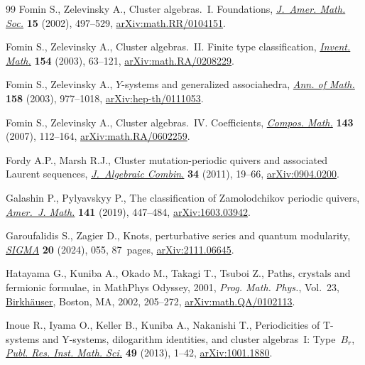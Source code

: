 \documentclass[pdftex]{sigma}
\numberwithin{equation}{section}
\theoremstyle{definition}
\begin{document}
\begin{thebibliography}{99}
Fomin S., Zelevinsky A., Cluster algebras.~{I}. {F}oundations,
 \href{https://doi.org/10.1090/S0894-0347-01-00385-X}{\textit{J.~Amer. Math.
 Soc.}} \textbf{15} (2002), 497--529,
 \href{http://arxiv.org/abs/math.RR/0104151}{arXiv:math.RR/0104151}.

Fomin S., Zelevinsky A., Cluster algebras.~{II}. {F}inite type classification,
 \href{https://doi.org/10.1007/s00222-003-0302-y}{\textit{Invent. Math.}}
 \textbf{154} (2003), 63--121,
 \href{http://arxiv.org/abs/math.RA/0208229}{arXiv:math.RA/0208229}.

Fomin S., Zelevinsky A., {$Y$}-systems and generalized associahedra,
 \href{https://doi.org/10.4007/annals.2003.158.977}{\textit{Ann. of Math.}}
 \textbf{158} (2003), 977--1018,
 \href{http://arxiv.org/abs/hep-th/0111053}{arXiv:hep-th/0111053}.

Fomin S., Zelevinsky A., Cluster algebras.~{IV}. {C}oefficients,
 \href{https://doi.org/10.1112/S0010437X06002521}{\textit{Compos. Math.}}
 \textbf{143} (2007), 112--164,
 \href{http://arxiv.org/abs/math.RA/0602259}{arXiv:math.RA/0602259}.

Fordy A.P., Marsh R.J., Cluster mutation-periodic quivers and associated
 {L}aurent sequences,
 \href{https://doi.org/10.1007/s10801-010-0262-4}{\textit{J.~Algebraic
 Combin.}} \textbf{34} (2011), 19--66,
 \href{http://arxiv.org/abs/0904.0200}{arXiv:0904.0200}.

Galashin P., Pylyavskyy P., The classification of {Z}amolodchikov periodic
 quivers, \href{https://doi.org/10.1353/ajm.2019.0010}{\textit{Amer.~J.
 Math.}} \textbf{141} (2019), 447--484,
 \href{http://arxiv.org/abs/1603.03942}{arXiv:1603.03942}.

Garoufalidis S., Zagier D., Knots, perturbative series and quantum modularity,
 \href{https://doi.org/10.3842/SIGMA.2024.055}{\textit{SIGMA}} \textbf{20}
 (2024), 055, 87~pages,
 \href{http://arxiv.org/abs/2111.06645}{arXiv:2111.06645}.

Hatayama G., Kuniba A., Okado M., Takagi T., Tsuboi Z., Paths, crystals and
 fermionic formulae, in Math{P}hys {O}dyssey, 2001, \textit{Prog. Math.
 Phys.}, Vol.~23,
 \href{https://doi.org/10.1007/978-1-4612-0087-1_9}{Birkh\"auser}, Boston, MA,
 2002, 205--272,
 \href{http://arxiv.org/abs/math.QA/0102113}{arXiv:math.QA/0102113}.

Inoue R., Iyama O., Keller B., Kuniba A., Nakanishi T., Periodicities of
 {T}-systems and {Y}-systems, dilogarithm identities, and cluster
 algebras~{I}: {T}ype~{$B_r$},
 \href{https://doi.org/10.4171/PRIMS/95}{\textit{Publ. Res. Inst. Math. Sci.}}
 \textbf{49} (2013), 1--42,
 \href{http://arxiv.org/abs/1001.1880}{arXiv:1001.1880}.


\end{thebibliography}
\end{document}
